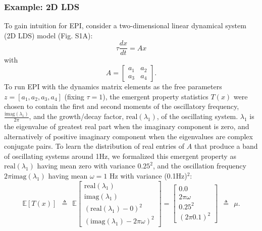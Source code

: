 \documentclass[11pt]{article}
\begin{document}
\subsubsection{Example: 2D LDS}\label{methods_2DLDS}
To gain intuition for EPI, consider a two-dimensional linear dynamical system (2D LDS) model (Fig. S1A):
\begin{equation} 
\tau \frac{dx}{dt} = Ax
\end{equation}
with
\begin{equation}
A = \begin{bmatrix} a_1 & a_2 \\ a_3 & a_4 \end{bmatrix}.
\end{equation}
To run EPI with the dynamics matrix elements as the free parameters $z = [ a_1, a_2, a_3, a_4]$ (fixing $\tau=1$), the emergent property statistics $T(x)$ were chosen to contain the first and second moments of the oscillatory frequency, $\frac{\text{imag}(\lambda_1)}{2 \pi}$, and the growth/decay factor, $\text{real}(\lambda_1)$, of the oscillating system. 
 $\lambda_1$ is the eigenvalue of greatest real part when the imaginary component is zero, and alternatively of positive imaginary component when the eigenvalues are complex conjugate pairs.  
To learn the distribution of real entries of $A$ that produce a band of oscillating systems around 1Hz, we formalized this emergent property as $\text{real}(\lambda_1)$ having mean zero with variance $0.25^2$, and the oscillation frequency $2 \pi \text{imag}(\lambda_1)$ having mean $\omega = 1$ Hz with variance (0.1Hz)$^2$:
\begin{equation}
 \mathbb{E}\left[T(x) \right] ~~ \triangleq ~~ \mathbb{E} \begin{bmatrix} \text{real}(\lambda_1) \\ \text{imag}(\lambda_1) \\ (\text{real}(\lambda_1)-0)^2  \\ (\text{imag}(\lambda_1)-2 \pi \omega)^2 \end{bmatrix} = \begin{bmatrix} 0.0 \\ 2 \pi \omega \\ 0.25^2 \\ (2 \pi 0.1)^2 \end{bmatrix} ~~ \triangleq ~~ \mu.
 \end{equation} 
\end{document}
